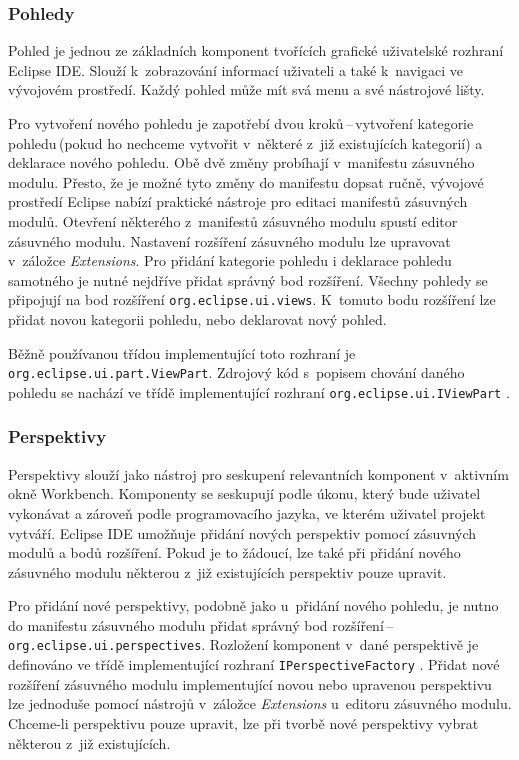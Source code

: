       \subsubsection{Pohledy}
      Pohled je jednou ze základních komponent tvořících grafické uživatelské rozhraní Eclipse IDE. Slouží k~zobrazování informací uživateli a také k~navigaci ve vývojovém prostředí. Každý pohled může mít svá menu a své nástrojové lišty.
      
      Pro vytvoření nového pohledu je zapotřebí dvou kroků\,--\,vytvoření kategorie pohledu\,(pokud ho nechceme vytvořit v~některé z~již existujících kategorií) a deklarace nového pohledu. Obě dvě změny probíhají v~manifestu zásuvného modulu. Přesto, že je možné tyto změny do manifestu dopsat ručně, vývojové prostředí Eclipse nabízí praktické nástroje pro editaci manifestů zásuvných modulů. Otevření některého z~manifestů zásuvného modulu spustí editor zásuvného modulu. Nastavení rozšíření zásuvného modulu lze upravovat v~záložce \emph{Extensions}. Pro přidání kategorie pohledu i deklarace pohledu samotného je nutné nejdříve přidat správný bod rozšíření. Všechny pohledy se připojují na bod rozšíření \texttt{org.eclipse.ui.views}. K~tomuto bodu rozšíření lze přidat novou kategorii pohledu, nebo deklarovat nový pohled.

      Běžně používanou třídou implementující toto rozhraní je \texttt{org.eclipse.ui.part.ViewPart}. Zdrojový kód s~popisem chování daného pohledu se nachází ve třídě implementující rozhraní \texttt{org.eclipse.ui.IViewPart} \cite{Plugins}.

      \subsubsection{Perspektivy}
      Perspektivy slouží jako nástroj pro seskupení relevantních komponent v~aktivním okně Workbench. Komponenty se seskupují podle úkonu, který bude uživatel vykonávat a  zároveň podle programovacího jazyka, ve kterém uživatel projekt vytváří. Eclipse IDE umožňuje přidání nových perspektiv pomocí zásuvných modulů a bodů rozšíření. Pokud je to žádoucí, lze také při přidání nového zásuvného modulu některou z~již existujících perspektiv pouze upravit.

      Pro přidání nové perspektivy, podobně jako u~přidání nového pohledu, je nutno do manifestu zásuvného modulu přidat správný bod rozšíření\,--\,\texttt{org.eclipse.ui.perspectives}. Rozložení komponent v~dané perspektivě je definováno ve třídě implementující rozhraní \texttt{IPerspectiveFactory} \cite{Plugins}. Přidat nové rozšíření zásuvného modulu implementující novou nebo upravenou perspektivu lze jednoduše pomocí nástrojů v~záložce \emph{Extensions} u~editoru zásuvného modulu. Chceme-li perspektivu pouze upravit, lze při tvorbě nové perspektivy vybrat některou z~již existujících.

